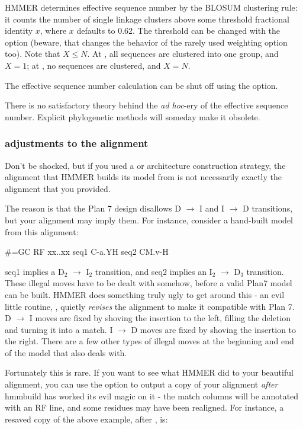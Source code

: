 HMMER determines effective sequence number by the BLOSUM clustering
rule: it counts the number of single linkage clusters above some
threshold fractional identity $x$, where $x$ defaults to 0.62.  The
threshold can be changed with the  option (beware,
that changes the behavior of the rarely used 
weighting option too). Note that $X \leq N$. At ,
all sequences are clustered into one group, and $X=1$; at
, no sequences are clustered, and $X=N$.

The effective sequence number calculation can be shut off using the
 option.

There is no satisfactory theory behind the \emph{ad hoc}-ery of the
effective sequence number. Explicit phylogenetic methods will someday
make it obsolete.

\subsubsection{adjustments to the alignment}

Don't be shocked, but if you used a  or 
architecture construction strategy, the alignment that HMMER builds
its model from is not necessarily exactly the alignment that you
provided.

The reason is that the Plan 7 design disallows D $\rightarrow$ I and I
$\rightarrow$ D transitions, but your alignment may imply them.  For
instance, consider a hand-built model from this alignment:

\begin{sreoutput}
#=GC RF   xx..xx
seq1      C-a.YH
seq2      CM.v-H
\end{sreoutput}

seq1 implies a D$_2$ $\rightarrow$ I$_2$ transition, and seq2 implies
an I$_2$ $\rightarrow$ D$_3$ transition. These illegal moves have to
be dealt with somehow, before a valid Plan7 model can be built. HMMER
does something truly ugly to get around this - an evil little routine,
, quietly \emph{revises} the
alignment to make it compatible with Plan 7.  D $\rightarrow$ I moves
are fixed by shoving the insertion to the left, filling the deletion
and turning it into a match.  I $\rightarrow$ D moves are fixed by
shoving the insertion to the right. There are a few other types of
illegal moves at the beginning and end of the model that
 also deals with.

Fortunately this is rare. If you want to see what HMMER did to your
beautiful alignment, you can use the  option to
output a copy of your alignment \emph{after} hmmbuild has worked its
evil magic on it - the match columns will be annotated with an RF
line, and some residues may have been realigned. For instance, a
resaved copy of the above example, after ,
is:

